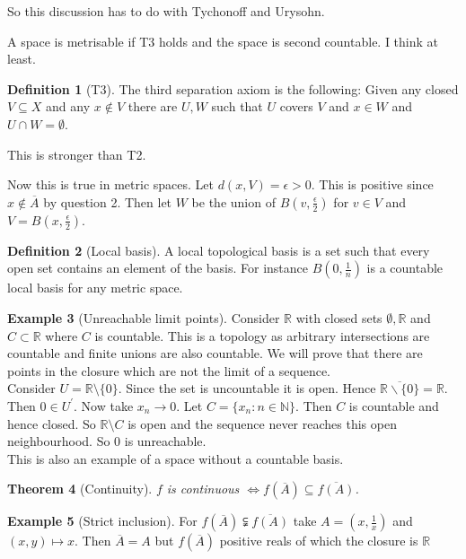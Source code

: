 \documentclass[11pt,a4paper]{article}
\newtheorem{theorem}{Theorem}[section]
\theoremstyle{definition}
\newtheorem{definition}[theorem]{Definition}
\newtheorem{example}[theorem]{Example}
\begin{document}
So this discussion has to do with Tychonoff and Urysohn.

A space is metrisable if T3 holds and the space is second countable. I think at least.

\begin{definition}[T3]
The third separation axiom is the following: Given any closed $V \subseteq X$ and any $x \notin V$ there are $U,W$ such that $U$ covers $V$ and $x \in W$ and $U \cap W = \emptyset$. 
\end{definition}

This is stronger than T2.

Now this is true in metric spaces. Let $d(x,V) = \epsilon > 0$. This is positive since $x \notin \overline{A}$ by question 2. Then let $W$ be the union of $B(v, \frac{\epsilon}{2})$ for $v \in V$ and $V = B(x, \frac{\epsilon}{2})$.

\begin{definition}[Local basis]
A local topological basis is a set such that every open set contains an element of the basis. For instance $B(0,\frac{1}{n})$ is a countable local basis for any metric space.
\end{definition} 

\begin{example}[Unreachable limit points]

Consider $\mathbb{R}$ with closed sets $\emptyset, \mathbb{R}$ and $C \subset \mathbb{R}$ where $C$ is countable. This is a topology as arbitrary intersections are countable and finite unions are also countable. We will prove that there are points in the closure which are not the limit of a sequence.
\\
Consider $U = \mathbb{R} \setminus \{0\}$. Since the set is uncountable it is open. Hence $\overline{\mathbb{R} \smallsetminus \{0\}} = \mathbb{R}$. Then $0 \in U^\prime$. Now take $x_n \to 0$. Let $C = \{x_n : n \in \mathbb{N}\}$. Then $C$ is countable and hence closed. So $\mathbb{R} \setminus C$ is open and the sequence never reaches this open neighbourhood. So 0 is unreachable. 
\\
This is also an example of a space without a countable basis.
\end{example}


\begin{theorem}[Continuity]
$f$ is continuous $\iff f(\overline{A}) \subseteq \overline{f(A)}$. 
\end{theorem}

\begin{example}[Strict inclusion]
For $f(\overline{A}) \subsetneqq \overline{f(A)}$ take $A = {(x, \frac{1}{x})}$ and $(x,y) \mapsto x$. Then $\overline{A} = A$ but $f(\overline{A})$ positive reals of which the closure is $\mathbb{R}$
\end{example}
\end{document}
